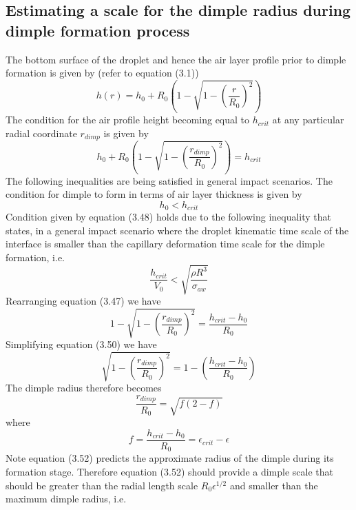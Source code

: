 \documentclass{jfm}
\begin{document}
\subsection{Estimating a scale for the dimple radius during dimple formation process}
The bottom surface of the droplet and hence the air layer profile prior to dimple formation is given by (refer to equation (3.1))
\begin{equation}
    h(r) = h_0 + R_0\left(1-\sqrt{1-\left(\frac{r}{R_0}\right)^2}\right)
\end{equation}
The condition for the air profile height becoming equal to $h_{crit}$ at any particular radial coordinate $r_{dimp}$ is given by
\begin{equation}
    h_0 + R_0\left(1-\sqrt{1-\left(\frac{r_{dimp}}{R_0}\right)^2}\right) = h_{crit}
\end{equation}
The following inequalities are being satisfied in general impact scenarios. The condition for dimple to form in terms of air layer thickness is given by
\begin{equation}
    h_0<h_{crit}
\end{equation}
Condition given by equation (3.48) holds due to the following inequality that states, in a general impact scenario where the droplet kinematic time scale of the interface is smaller than the capillary deformation time scale for the dimple formation, i.e.
\begin{equation}
    \frac{h_{crit}}{V_0}<\sqrt{\frac{{\rho}R^3}{{\sigma}_{aw}}}
\end{equation}
Rearranging equation (3.47) we have
\begin{equation}
    1-\sqrt{1-\left(\frac{r_{dimp}}{R_0}\right)^2} = \frac{h_{crit}-h_0}{R_0}
\end{equation}
Simplifying equation (3.50) we have
\begin{equation}
    \sqrt{1-\left(\frac{r_{dimp}}{R_0}\right)^2} = 1 - \left(\frac{h_{crit}-h_0}{R_0}\right)
\end{equation}
The dimple radius therefore becomes
\begin{equation}
    \frac{r_{dimp}}{R_0}=\sqrt{f(2-f)}
\end{equation}
where
\begin{equation}
    f = \frac{h_{crit}-h_0}{R_0}={\epsilon}_{crit}-{\epsilon}
\end{equation}
Note equation (3.52) predicts the approximate radius of the dimple during its formation stage. Therefore equation (3.52) should provide a dimple scale that should be greater than the radial length scale $R_0{\epsilon}^{1/2}$ and smaller than the maximum dimple radius, i.e.
\end{document}
